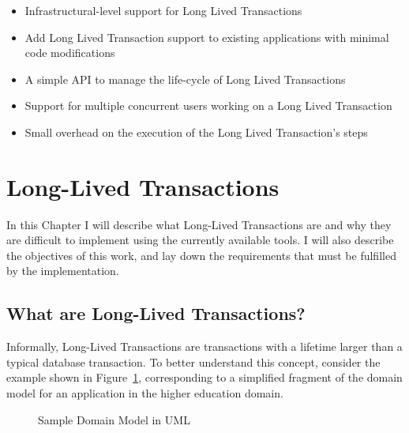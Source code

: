 \documentclass{llncs}
\begin{document}
\begin{itemize}

\item Infrastructural-level support for Long Lived
  Transactions

\item Add Long Lived Transaction support to existing applications with
  minimal code modifications

\item A simple API to manage the life-cycle of Long Lived Transactions

\item Support for multiple concurrent users working on a Long Lived
  Transaction

\item Small overhead on the execution of the Long Lived Transaction's
  steps

\end{itemize}


\section{Long-Lived Transactions}

In this Chapter I will describe what Long-Lived Transactions are and
why they are difficult to implement using the currently available
tools. I will also describe the objectives of this work, and lay down
the requirements that must be fulfilled by the implementation.

\subsection{What are Long-Lived Transactions?}
\label{sec:what}

Informally, Long-Lived Transactions are transactions with a lifetime
larger than a typical database transaction. To better understand this
concept, consider the example shown in Figure~\ref{fig:courseDomain},
corresponding to a simplified fragment of the domain model for an
application in the higher education domain.

\begin{figure}
  \centering

\caption{Sample Domain Model in UML}
\label{fig:courseDomain}

\end{figure}
\end{document}
